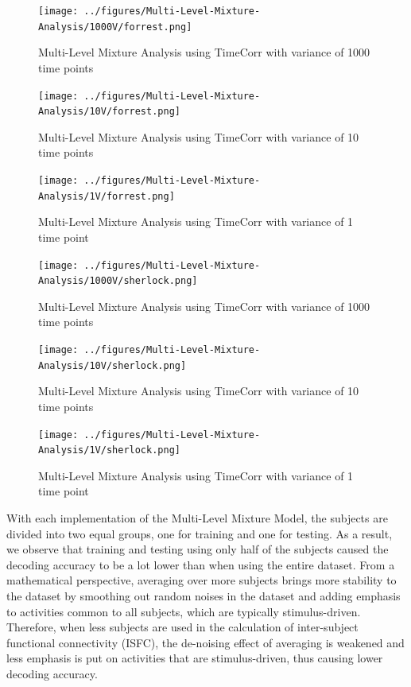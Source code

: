 \documentclass[11pt]{article}
\begin{document}
\begin{figure}[!htb]
\caption{Multi-Level Mixture Analysis using TimeCorr with variance of 1000 time points}
\centering
\texttt{[image: ../figures/Multi-Level-Mixture-Analysis/1000V/forrest.png]}
\label{fig:forrestMM1000}
\end{figure}

\begin{figure}[!htb]
\caption{Multi-Level Mixture Analysis using TimeCorr with variance of 10 time points}
\centering
\texttt{[image: ../figures/Multi-Level-Mixture-Analysis/10V/forrest.png]}
\label{fig:forrestMM10}
\end{figure}

\begin{figure}[!htb]
\caption{Multi-Level Mixture Analysis using TimeCorr with variance of 1 time point}
\centering
\texttt{[image: ../figures/Multi-Level-Mixture-Analysis/1V/forrest.png]}
\label{fig:forrestMM1}
\end{figure}

\begin{figure}[!htb]
\caption{Multi-Level Mixture Analysis using TimeCorr with variance of 1000 time points}
\centering
\texttt{[image: ../figures/Multi-Level-Mixture-Analysis/1000V/sherlock.png]}
\label{fig:sherlockMM1000}
\end{figure}

\begin{figure}[!htb]
\caption{Multi-Level Mixture Analysis using TimeCorr with variance of 10 time points}
\centering
\texttt{[image: ../figures/Multi-Level-Mixture-Analysis/10V/sherlock.png]}
\label{fig:sherlockMM10}
\end{figure}

\begin{figure}[!htb]
\caption{Multi-Level Mixture Analysis using TimeCorr with variance of 1 time point}
\centering
\texttt{[image: ../figures/Multi-Level-Mixture-Analysis/1V/sherlock.png]}
\label{fig:sherlockMM1}
\end{figure}

With each implementation of the Multi-Level Mixture Model, the subjects are divided into two equal groups, one for training and one for testing. As a result, we observe that training and testing using only half of the subjects caused the decoding accuracy to be a lot lower than when using the entire dataset. From a mathematical perspective, averaging over more subjects brings more stability to the dataset by smoothing out random noises in the dataset and adding emphasis to activities common to all subjects, which are typically stimulus-driven. Therefore, when less subjects are used in the calculation of inter-subject functional connectivity (ISFC), the de-noising effect of averaging is weakened and less emphasis is put on activities that are stimulus-driven, thus causing lower decoding accuracy.
\end{document}
